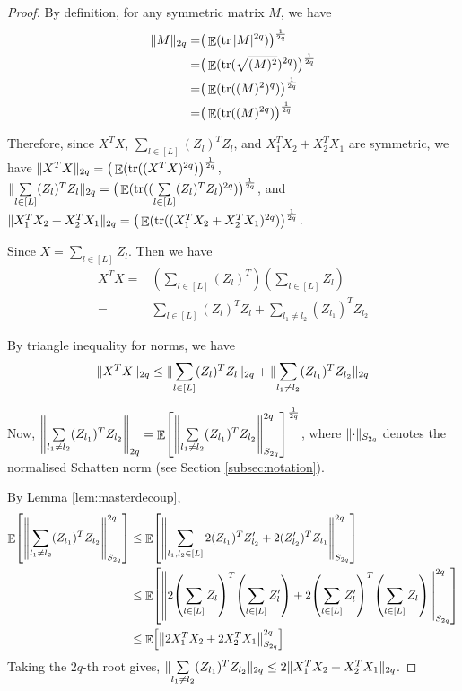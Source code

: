 \documentclass[11pt]{amsart}
\numberwithin{equation}{section}
\numberwithin{equation}{section}
\DeclareMathOperator{\E}{\mathbb{E}}
\DeclareMathOperator*{\tr}{tr}
\DeclarePairedDelimiter{\norm}{\lVert}{\rVert}
\DeclarePairedDelimiter{\paren}{(}{)}
\DeclarePairedDelimiter{\sqbr}{[}{]}
\begin{document}
\begin{proof}
By definition, for any symmetric matrix $M$, we have
\begin{align*}
     \norm{M}_{2q}=&\big(\E(\tr |M|^{2q})\big)^{\frac{1}{2q}}
     \\=&\big(\E(\tr (\sqrt{(M)^2})^{2q})\big)^{\frac{1}{2q}}
     \\=&\big(\E(\tr ((M)^2)^{q})\big)^{\frac{1}{2q}}
     \\=&\big(\E(\tr ((M)^{2q})\big)^{\frac{1}{2q}}
 \end{align*}

Therefore, since $X^TX$, $\sum \limits_{l \in [L]}(Z_l)^TZ_l$, and $X_1^TX_2+X_2^TX_1$ are symmetric, we have $\norm{X^TX}_{2q}=\big(\E(\tr ((X^TX)^{2q})\big)^{\frac{1}{2q}}$, $\norm{\sum \limits_{l \in [L]}(Z_l)^TZ_l}_{2q}=\big(\E(\tr ((\sum \limits_{l \in [L]}(Z_l)^TZ_l)^{2q})\big)^{\frac{1}{2q}}$, and $\norm{X_1^TX_2+X_2^TX_1}_{2q}=\big(\E(\tr ((X_1^TX_2+X_2^TX_1)^{2q})\big)^{\frac{1}{2q}}$.

Since $X=\sum \limits_{l \in [L]}Z_l$. Then we have
\begin{align*}
    X^TX=&(\sum \limits_{l \in [L]}(Z_l)^T)(\sum \limits_{l \in [L]}Z_l)
    \\=&\sum \limits_{l \in [L]}(Z_l)^TZ_l + \sum \limits_{l_1 \ne l_2}(Z_{l_1})^TZ_{l_2}
\end{align*}

By triangle inequality for norms, we have
\begin{align*}
    \norm{X^TX}_{2q} \le \norm{\sum \limits_{l \in [L]}(Z_l)^TZ_l}_{2q}+ \norm{\sum \limits_{l_1 \ne l_2}(Z_{l_1})^TZ_{l_2}}_{2q}
\end{align*}

Now, $\norm*{\sum \limits_{l_1 \ne l_2}(Z_{l_1})^TZ_{l_2}}_{2q} = \E \sqbr*{ \norm*{\sum \limits_{l_1 \ne l_2}(Z_{l_1})^TZ_{l_2}}_{S_{2q}}^{2q} }^\frac{1}{2q}$, where $\norm{\cdot}_{S_{2q}}$ denotes the normalised Schatten norm (see Section \ref{subsec:notation}).

By Lemma \ref{lem:masterdecoup}, 
\begin{align*}
    \E \sqbr*{ \norm*{\sum \limits_{l_1 \ne l_2}(Z_{l_1})^TZ_{l_2}}_{S_{2q}}^{2q} } &\le \E \sqbr*{ \norm*{\sum \limits_{l_1, l_2 \in [L]} 2(Z_{l_1})^TZ'_{l_2} + 2(Z'_{l_2})^TZ_{l_1} }_{S_{2q} }^{2q} } \\
    &\le  \E \sqbr*{ \norm*{ 2\paren*{\sum \limits_{l \in [L]}Z_l}^T \paren*{\sum \limits_{l \in [L]}Z'_l} + 2\paren*{\sum \limits_{l \in [L]}Z'_l}^T \paren*{\sum \limits_{l \in [L]}Z_l} }_{S_{2q}}^{2q} } \\
    &\le  \E \sqbr*{ \norm*{ 2X_1^TX_2+2X_2^TX_1}^{2q}_{S_{2q}} } \\
\end{align*}
Taking the $2q$-th root gives, $\norm{\sum \limits_{l_1 \ne l_2}(Z_{l_1})^TZ_{l_2}}_{2q} \le 2\norm{X_1^TX_2+X_2^TX_1}_{2q}$.



\end{proof}
\end{document}
